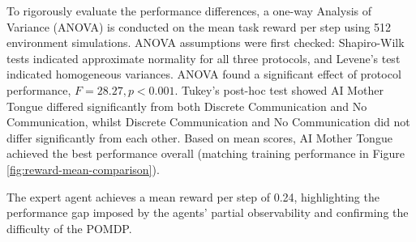 

To rigorously evaluate the performance differences, a one-way Analysis of Variance (ANOVA) is conducted on the mean task reward per step using 512 environment simulations.
ANOVA assumptions were first checked: Shapiro-Wilk tests indicated approximate normality for all three protocols, and Levene's test indicated homogeneous variances.
ANOVA found a significant effect of protocol performance, $F=28.27,p<0.001$.
Tukey's post-hoc test showed AI Mother Tongue differed significantly from both Discrete Communication and No Communication, whilst Discrete Communication and No Communication did not differ significantly from each other.
Based on mean scores, AI Mother Tongue achieved the best performance overall (matching training performance in Figure \ref{fig:reward-mean-comparison}).


The expert agent achieves a mean reward per step of 0.24, highlighting the performance gap imposed by the agents' partial observability and confirming the difficulty of the POMDP.

